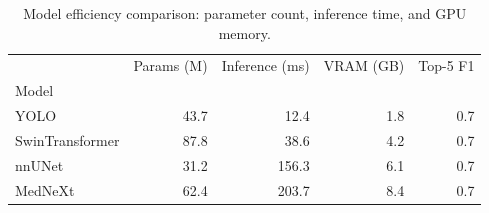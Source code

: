 \begin{table}
\caption{Model efficiency comparison: parameter count, inference time, and GPU memory.}
\label{tab:efficiency}
\begin{tabular}{lrrrr}
\toprule
 & Params (M) & Inference (ms) & VRAM (GB) & Top-5 F1 \\
Model &  &  &  &  \\
\midrule
YOLO & 43.7 & 12.4 & 1.8 & 0.7 \\
SwinTransformer & 87.8 & 38.6 & 4.2 & 0.7 \\
nnUNet & 31.2 & 156.3 & 6.1 & 0.7 \\
MedNeXt & 62.4 & 203.7 & 8.4 & 0.7 \\
\bottomrule
\end{tabular}
\end{table}

